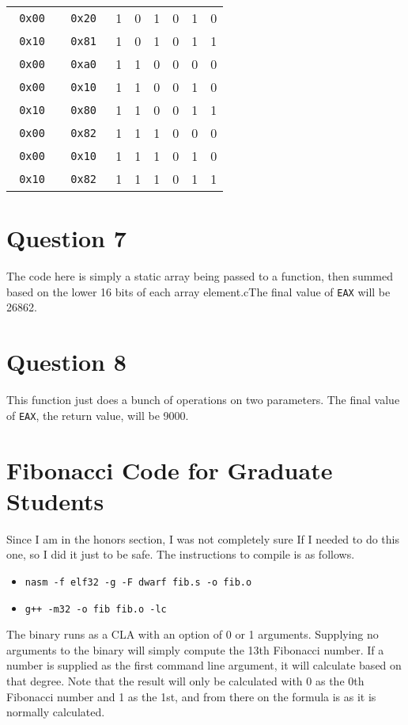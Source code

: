 \documentclass[11pt]{article}
\begin{document}
\begin{table}[H]
\begin{tabular}{|c|c|c|c|c|c|c|c|}
        \texttt{ 0x00 } & \texttt{ 0x20 } & 1 & 0 & 1 & 0 & 1 & 0 \\
        \texttt{ 0x10 } & \texttt{ 0x81 } & 1 & 0 & 1 & 0 & 1 & 1 \\
        \texttt{ 0x00 } & \texttt{ 0xa0 } & 1 & 1 & 0 & 0 & 0 & 0 \\
        \texttt{ 0x00 } & \texttt{ 0x10 } & 1 & 1 & 0 & 0 & 1 & 0 \\
        \texttt{ 0x10 } & \texttt{ 0x80 } & 1 & 1 & 0 & 0 & 1 & 1 \\
        \texttt{ 0x00 } & \texttt{ 0x82 } & 1 & 1 & 1 & 0 & 0 & 0 \\
        \texttt{ 0x00 } & \texttt{ 0x10 } & 1 & 1 & 1 & 0 & 1 & 0 \\
        \texttt{ 0x10 } & \texttt{ 0x82 } & 1 & 1 & 1 & 0 & 1 & 1 \\
        
        \hline
    \end{tabular}
\end{table}

\section*{Question 7}
The code here is simply a static array being passed to a function, then summed based on the lower 16 bits of each array element.cThe final value of \texttt{EAX} will be 26862.

\section*{Question 8}
This function just does a bunch of operations on two parameters. The final value of \texttt{EAX}, the return value, will be 9000.

\section*{Fibonacci Code for Graduate Students}
Since I am in the honors section, I was not completely sure If I needed to do this one, so I did it just to be safe. The instructions to compile is as follows.
\begin{itemize}
    \item \texttt{nasm -f elf32 -g -F dwarf fib.s -o fib.o}
    \item \texttt{g++ -m32 -o fib fib.o -lc}
\end{itemize}

The binary runs as a CLA with an option of 0 or 1 arguments. Supplying no arguments to the binary will simply compute the 13th Fibonacci number. If a number is supplied as the first command line argument, it will calculate based on that degree. Note that the result will only be calculated with 0 as the 0th Fibonacci number and 1 as the 1st, and from there on the formula is as it is normally calculated.
\end{document}
